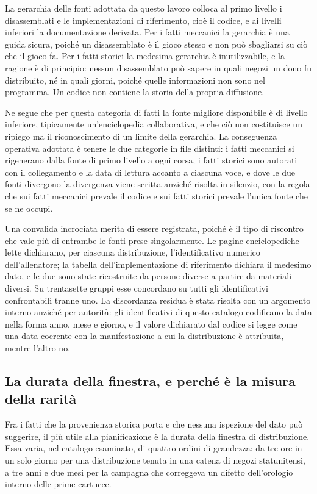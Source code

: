 La gerarchia delle fonti adottata da questo lavoro colloca al primo livello i disassemblati e le implementazioni di riferimento, cioè il codice, e ai livelli inferiori la documentazione derivata. Per i fatti meccanici la gerarchia è una guida sicura, poiché un disassemblato è il gioco stesso e non può sbagliarsi su ciò che il gioco fa. Per i fatti storici la medesima gerarchia è inutilizzabile, e la ragione è di principio: nessun disassemblato può sapere in quali negozi un dono fu distribuito, né in quali giorni, poiché quelle informazioni non sono nel programma. Un codice non contiene la storia della propria diffusione.

Ne segue che per questa categoria di fatti la fonte migliore disponibile è di livello inferiore, tipicamente un'enciclopedia collaborativa, e che ciò non costituisce un ripiego ma il riconoscimento di un limite della gerarchia. La conseguenza operativa adottata è tenere le due categorie in file distinti: i fatti meccanici si rigenerano dalla fonte di primo livello a ogni corsa, i fatti storici sono autorati con il collegamento e la data di lettura accanto a ciascuna voce, e dove le due fonti divergono la divergenza viene scritta anziché risolta in silenzio, con la regola che sui fatti meccanici prevale il codice e sui fatti storici prevale l'unica fonte che se ne occupi.

Una convalida incrociata merita di essere registrata, poiché è il tipo di riscontro che vale più di entrambe le fonti prese singolarmente. Le pagine enciclopediche lette dichiarano, per ciascuna distribuzione, l'identificativo numerico dell'allenatore; la tabella dell'implementazione di riferimento dichiara il medesimo dato, e le due sono state ricostruite da persone diverse a partire da materiali diversi. Su trentasette gruppi esse concordano su tutti gli identificativi confrontabili tranne uno. La discordanza residua è stata risolta con un argomento interno anziché per autorità: gli identificativi di questo catalogo codificano la data nella forma anno, mese e giorno, e il valore dichiarato dal codice si legge come una data coerente con la manifestazione a cui la distribuzione è attribuita, mentre l'altro no.

\subsection*{La durata della finestra, e perché è la misura della rarità}

Fra i fatti che la provenienza storica porta e che nessuna ispezione del dato può suggerire, il più utile alla pianificazione è la durata della finestra di distribuzione. Essa varia, nel catalogo esaminato, di quattro ordini di grandezza: da tre ore in un solo giorno per una distribuzione tenuta in una catena di negozi statunitensi, a tre anni e due mesi per la campagna che correggeva un difetto dell'orologio interno delle prime cartucce.

